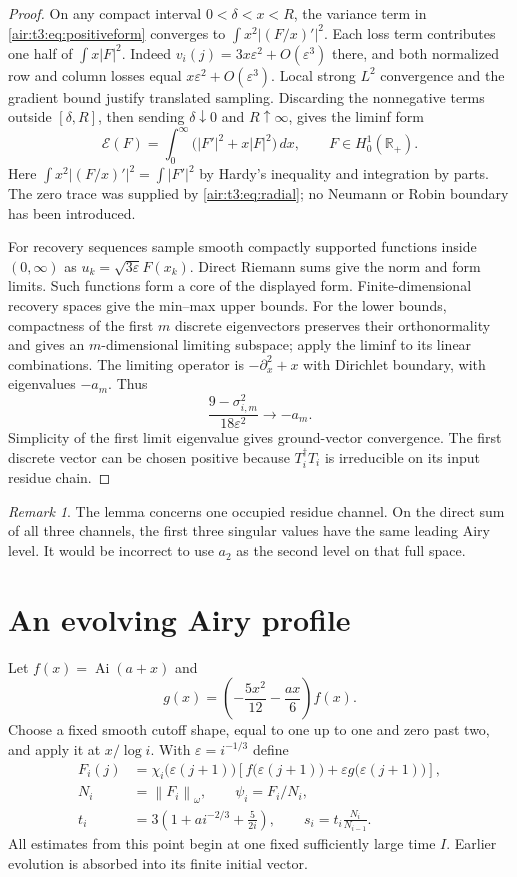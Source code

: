 \documentclass[11pt,letterpaper]{article}
\numberwithin{equation}{section}
\theoremstyle{remark}
\newtheorem{remark}[theorem]{Remark}
\newcommand{\Ai}{\operatorname{Ai}}
\newcommand{\norm}[1]{\left\lVert#1\right\rVert}
\newcommand{\R}{\mathbb{R}}
\newcommand{\eps}{\varepsilon}
\begin{document}
\begin{proof}
On any compact interval $0<\delta<x<R$, the variance term in \eqref{air:t3:eq:positiveform} converges to
$\int x^2|(F/x)'|^2$. Each loss term contributes one half of $\int x|F|^2$. Indeed $v_i(j)=3x\eps^2+O(\eps^3)$ there, and both normalized row and column losses equal $x\eps^2+O(\eps^3)$. Local strong $L^2$ convergence and the gradient bound justify translated sampling. Discarding the nonnegative terms outside $[\delta,R]$, then sending $\delta\downarrow0$ and $R\uparrow\infty$, gives the liminf form
\[
\mathcal E(F)=\int_0^\infty\bigl(|F'|^2+x|F|^2\bigr)\,dx,
\qquad F\in H^1_0(\R_+).
\]
Here $\int x^2|(F/x)'|^2=\int|F'|^2$ by Hardy's inequality and integration by parts. The zero trace was supplied by \eqref{air:t3:eq:radial}; no Neumann or Robin boundary has been introduced.

For recovery sequences sample smooth compactly supported functions inside $(0,\infty)$ as $u_k=\sqrt{3\eps}F(x_k)$. Direct Riemann sums give the norm and form limits. Such functions form a core of the displayed form. Finite-dimensional recovery spaces give the min--max upper bounds. For the lower bounds, compactness of the first $m$ discrete eigenvectors preserves their orthonormality and gives an $m$-dimensional limiting subspace; apply the liminf to its linear combinations. The limiting operator is $-\partial_x^2+x$ with Dirichlet boundary, with eigenvalues $-a_m$. Thus
\[
\frac{9-\sigma_{i,m}^2}{18\eps^2}\longrightarrow-a_m.
\]
Simplicity of the first limit eigenvalue gives ground-vector convergence. The first discrete vector can be chosen positive because $T_i^\dagger T_i$ is irreducible on its input residue chain.
\end{proof}

\begin{remark}
The lemma concerns one occupied residue channel. On the direct sum of all three channels, the first three singular values have the same leading Airy level. It would be incorrect to use $a_2$ as the second level on that full space.
\end{remark}

\section{An evolving Airy profile}
Let $f(x)=\Ai(a+x)$ and
\[
g(x)=\left(-\frac{5x^2}{12}-\frac{ax}{6}\right)f(x).
\]
Choose a fixed smooth cutoff shape, equal to one up to one and zero past two, and apply it at $x/\log i$. With $\eps=i^{-1/3}$ define
\begin{align*}
F_i(j)&=\chi_i\bigl(\eps(j+1)\bigr)
\left[f\bigl(\eps(j+1)\bigr)+\eps g\bigl(\eps(j+1)\bigr)\right],\\
N_i&=\norm{F_i}_\omega,\qquad \psi_i=F_i/N_i,\\
t_i&=3\left(1+a i^{-2/3}+\frac{5}{2i}\right),\qquad
s_i=t_i\frac{N_i}{N_{i-1}}.
\end{align*}
All estimates from this point begin at one fixed sufficiently large time $I$. Earlier evolution is absorbed into its finite initial vector.
\end{document}
